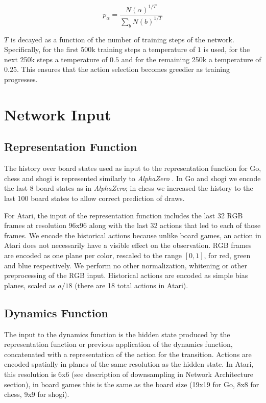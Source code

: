 \documentclass{article}
\newcommand{\alphazero}{\emph{AlphaZero}}
\begin{document}
\begin{appendices}
\begin{equation}
p_{\alpha} = \frac{N(\alpha)^{1 / T}}{\sum_{b} N(b)^{1 / T}}
\end{equation}

$T$ is decayed as a function of the number of training steps of the network. Specifically, for the first 500k training steps a temperature of $1$ is used, for the next 250k steps a temperature of $0.5$ and for the remaining 250k a temperature of $0.25$. This ensures that the action selection becomes greedier as training progresses.

\section{Network Input}

\subsection*{Representation Function}

The history over board states used as input to the representation function for Go, chess and shogi is represented similarly to \alphazero{} \cite{Silver18AZ}. In Go and shogi we encode the last 8 board states as in \alphazero{}; in chess we increased the history to the last 100 board states to allow correct prediction of draws.

For Atari, the input of the representation function includes the last 32 RGB frames at resolution 96x96 along with the last 32 actions that led to each of those frames. We encode the historical actions because unlike board games, an action in Atari does not necessarily have a visible effect on the observation. RGB frames are encoded as one plane per color, rescaled to the range $[0, 1]$, for red, green and blue respectively. We perform no other normalization, whitening or other preprocessing of the RGB input. Historical actions are encoded as simple bias planes, scaled as $a / 18$ (there are 18 total actions in Atari).

\subsection*{Dynamics Function}

The input to the dynamics function is the hidden state produced by the representation function or previous application of the dynamics function, concatenated with a representation of the action for the transition. Actions are encoded spatially in planes of the same resolution as the hidden state. In Atari, this resolution is 6x6 (see description of downsampling in Network Architecture section), in board games this is the same as the board size (19x19 for Go, 8x8 for chess, 9x9 for shogi).


\end{appendices}
\end{document}
